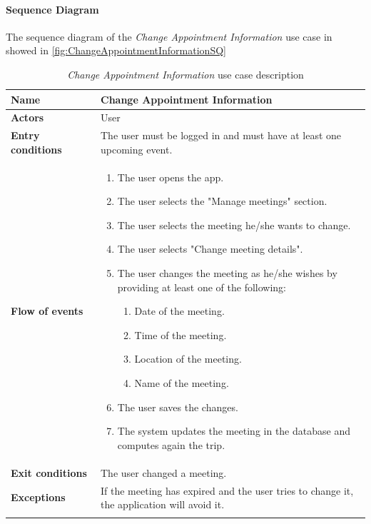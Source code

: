 \paragraph*{Sequence Diagram\\}
The sequence diagram of the \emph{Change Appointment Information} use case in showed in \autoref{fig:ChangeAppointmentInformationSQ}
\newpage
\begin{longtable}{p{0.25\linewidth}|p{0.75\linewidth}}
	\hline
		\label{tab:ChangeAppointmentInformationTAB}
	\textbf{Name} & \textbf{Change Appointment Information} \\
	\hline
	\textbf{Actors} & User \\
	\hline
	\textbf{Entry conditions} & The user must be logged in and must have at least one upcoming event.\\
	\hline
	\textbf{Flow of events} & 
	\begin{enumerate}
		\item The user opens the app.
		\item The user selects the "Manage meetings" section.
		\item The user selects the meeting he/she wants to change.
		\item The user selects "Change meeting details".
		\item The user changes the meeting as he/she wishes by providing at least one of the following:
	\begin{enumerate}
	\item Date of the meeting.
	\item Time of the meeting.
	\item Location of the meeting.
	\item Name of the meeting.
	\end{enumerate}
		\item The user saves the changes.
		\item The system updates the meeting in the database and computes again the trip.
	\end{enumerate}\\
	\hline
	\textbf{Exit conditions} & The user changed a meeting.\\
	\hline
	\textbf{Exceptions} & If the meeting has expired and the user tries to change it, the application will avoid it. \\
	\hline
	\caption{\emph{Change Appointment Information} use case description}
\end{longtable}

